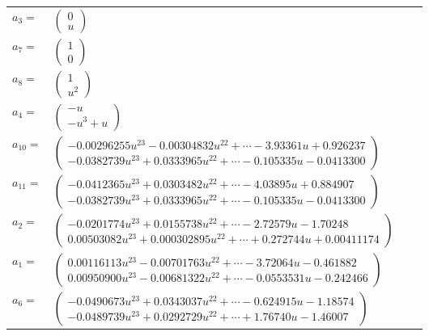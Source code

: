 \documentclass[1p]{elsarticle_modified}
\theoremstyle{definition}
\begin{document}
\begin{tabular}{m{7pt} m{180pt} m{7pt} m{180pt} }
\flushright $a_{3}=$&$\begin{pmatrix}0\\u\end{pmatrix}$ \\
\flushright $a_{7}=$&$\begin{pmatrix}1\\0\end{pmatrix}$ \\
\flushright $a_{8}=$&$\begin{pmatrix}1\\u^2\end{pmatrix}$ \\
\flushright $a_{4}=$&$\begin{pmatrix}- u\\- u^3+u\end{pmatrix}$ \\
\flushright $a_{10}=$&$\begin{pmatrix}-0.00296255 u^{23}-0.00304832 u^{22}+\cdots-3.93361 u+0.926237\\-0.0382739 u^{23}+0.0333965 u^{22}+\cdots-0.105335 u-0.0413300\end{pmatrix}$ \\
\flushright $a_{11}=$&$\begin{pmatrix}-0.0412365 u^{23}+0.0303482 u^{22}+\cdots-4.03895 u+0.884907\\-0.0382739 u^{23}+0.0333965 u^{22}+\cdots-0.105335 u-0.0413300\end{pmatrix}$ \\
\flushright $a_{2}=$&$\begin{pmatrix}-0.0201774 u^{23}+0.0155738 u^{22}+\cdots-2.72579 u-1.70248\\0.00503082 u^{23}+0.000302895 u^{22}+\cdots+0.272744 u+0.00411174\end{pmatrix}$ \\
\flushright $a_{1}=$&$\begin{pmatrix}0.00116113 u^{23}-0.00701763 u^{22}+\cdots-3.72064 u-0.461882\\0.00950900 u^{23}-0.00681322 u^{22}+\cdots-0.0553531 u-0.242466\end{pmatrix}$ \\
\flushright $a_{6}=$&$\begin{pmatrix}-0.0490673 u^{23}+0.0343037 u^{22}+\cdots-0.624915 u-1.18574\\-0.0489739 u^{23}+0.0292729 u^{22}+\cdots+1.76740 u-1.46007\end{pmatrix}$ \\

\end{tabular}
\end{document}
